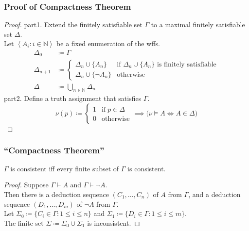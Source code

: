 \documentclass[UTF8,aspectratio=43,11pt,colorlinks,compress,openany]{beamer}%
\begin{document}
\begin{frame}\frametitle{Proof of Compactness Theorem}
	\begin{proof}
		part1. Extend the finitely satisfiable
		set $\Gamma$ to a maximal finitely satisfiable set $\Delta$.\\
		Let $\left\langle A_i: i\in\mathbb{N}\right\rangle$ be a fixed enumeration of the wffs.
		\begin{align*}
		\Delta_0&\coloneqq \Gamma\\
		\Delta_{n+1}&\coloneqq 
		\begin{cases}
		\Delta_n\cup\{A_n\} &\text{if $\Delta_n\cup\{A_n\}$ is finitely satisfiable}\\
		\Delta_n\cup\{\neg A_n\} &\text{otherwise}
		\end{cases}\\
		\Delta&\coloneqq \bigcup\limits_{n\in\mathbb{N}}\Delta_n
		\end{align*}
		part2. Define a truth assignment that satisfies $\Gamma$.
		\[\nu(p)\coloneqq 
		\begin{cases}
		1 &\text{if}\; p\in\Delta\\
		0 &\text{otherwise}
		\end{cases}\implies\big(\nu\vDash A\iff A\in\Delta\big)\]
	\end{proof}
\end{frame}

\begin{frame}\frametitle{``Compactness Theorem''}
	\begin{theorem}
		$\Gamma$ is consistent iff every finite subset of $\Gamma$ is consistent.
	\end{theorem}
	\begin{proof}
		Suppose $\Gamma\vdash A$ and $\Gamma\vdash\neg A$.\\
		Then there is a deduction sequence $(C_1,\dots,C_n)$ of $A$ from $\Gamma$, and a deduction sequence $(D_1,\dots,D_m)$ of $\neg A$ from $\Gamma$.\\
		Let $\Sigma_0\coloneqq \{C_i\in\Gamma: 1\leq i\leq n\}$ and $\Sigma_1\coloneqq \{D_i\in\Gamma: 1\leq i\leq m\}$.\\
		The finite set $\Sigma\coloneqq \Sigma_0\cup\Sigma_1$ is inconsistent.
	\end{proof}
\end{frame}
\end{document}
